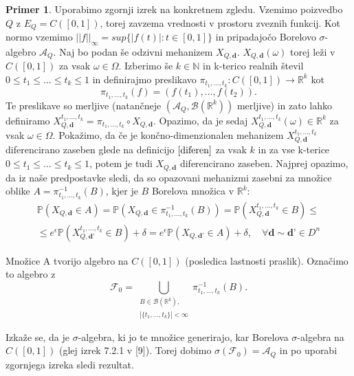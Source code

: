 \documentclass[12pt,a4paper]{amsart}
\theoremstyle{definition} %
\newtheorem{primer}[definicija]{Primer}
\theoremstyle{plain} %
\begin{document}
\begin{primer}
Uporabimo zgornji izrek na konkretnem zgledu. Vzemimo poizvedbo $Q$ z $E_Q = C([0,1])$, torej zavzema vrednosti v prostoru zveznih funkcij. Kot normo vzemimo $||f||_\infty = sup\{|f(t)| : t \in [0,1]\}$ in pripadajočo Borelovo $\sigma$-algebro $\mathcal{A}_Q$. Naj bo podan še odzivni mehanizem $X_{Q,\textbf{d}}$. $X_{Q,\textbf{d}}(\omega)$ torej leži v $C([0,1])$ za vsak $\omega \in \Omega$.
\newline
Izberimo še $k \in \mathbb{N}$ in k-terico realnih števil $0 \leq t_1 \leq \ldots \leq t_k \leq 1$ in definirajmo preslikavo $ \pi _{t_1,\ldots,t_k}: C([0,1]) \rightarrow \mathbb{R}^k$ kot $$\pi _{t_1,\ldots,t_k}(f) = (f(t_1),\ldots,f(t_2)).$$ Te preslikave so merljive (natančneje $(\mathcal{A}_Q, \mathcal{B}(\mathbb{R}^k))$ merljive) in zato lahko definiramo $X_{Q,\textbf{d}}^{t_1,\ldots,t_k} = \pi _{t_1,\ldots,t_k} \circ X_{Q,\textbf{d}}$. Opazimo, da je sedaj $X_{Q,\textbf{d}}^{t_1,\ldots,t_k} (\omega) \in \mathbb{R}^k$ za vsak $\omega \in \Omega$. Pokažimo, da če je končno-dimenzionalen mehanizem $X_{Q,\textbf{d}}^{t_1,\ldots,t_k}$ diferencirano zaseben glede na definicijo $\eqref{diferen}$ za vsak $k$ in za vse k-terice $0 \leq t_1 \leq \ldots \leq t_k \leq 1$, potem je tudi $X_{Q,\textbf{d}}$ diferencirano zaseben. Najprej opazimo, da iz naše predpostavke sledi, da so opazovani mehanizmi zasebni za množice oblike $A = \pi _{t_1,\ldots,t_k}^{-1}(B)$, kjer je $B$ Borelova množica v $\mathbb{R}^k$: 
\begin{gather*}
\mathbb{P}(X_{Q,\textbf{d}} \in A) =  \mathbb{P}(X_{Q,\textbf{d}} \in \pi _{t_1,\ldots,t_k}^{-1}(B)) = \mathbb{P}(X_{Q,\textbf{d}}^{t_1,\ldots,t_k} \in B) \leq \\
 \leq e^{\epsilon}\mathbb{P}(X_{Q,\textbf{d'}}^{t_1,\ldots,t_k} \in B) + \delta = e^{\epsilon}\mathbb{P}(X_{Q,\textbf{d'}} \in A) + \delta, \quad \forall \textbf{d} \sim \textbf{d'} \in D^n
\end{gather*}


Množice A tvorijo algebro na $C([0,1])$ (posledica lastnosti praslik). Označimo to algebro z 
$$\mathcal{F}_0 = \bigcup_{\substack{B \in \mathcal{B}(\mathbb{R}^k), \\ |\{t_1,...,t_k\}| < \infty}} \pi _{t_1,\ldots,t_k}^{-1}(B).$$

 Izkaže se, da je $\sigma$-algebra, ki jo te množice generirajo, kar Borelova $\sigma$-algebra na $C([0,1])$ (glej izrek 7.2.1 v [9]). Torej dobimo $\sigma({\mathcal{F}_0}) = \mathcal{A}_Q$ in po uporabi zgornjega izreka sledi rezultat.
\end{primer}
\end{document}

